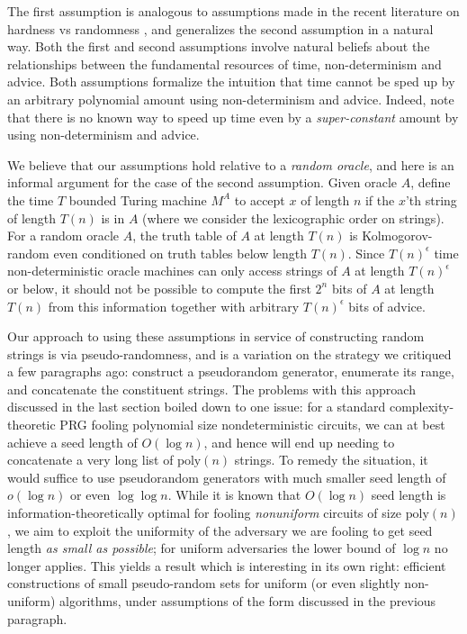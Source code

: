 \documentclass[11pt]{article}
\renewcommand{\poly}{\mathrm{poly}}
\begin{document}
The first assumption is analogous to assumptions made in the recent literature on hardness vs randomness \cite{CT21a}, and generalizes the second assumption in a natural way. Both the first and second assumptions involve natural beliefs about the relationships between the fundamental resources of time, non-determinism and advice. Both assumptions formalize the intuition that time cannot be sped up by an arbitrary polynomial amount using non-determinism and advice. Indeed, note that there is no known way to speed up time even by a {\it super-constant} amount by using non-determinism and advice. 

We believe that our assumptions hold relative to a {\it random oracle}, and here is an informal argument for the case of the second assumption. Given oracle $A$, define the time $T$ bounded Turing machine $M^A$ to accept $x$ of length $n$ if the $x$'th string of length $T(n)$ is in $A$ (where we consider the lexicographic order on strings). For a random oracle $A$, the truth table of $A$ at length $T(n)$ is Kolmogorov-random even conditioned on truth tables below length $T(n)$. Since $T(n)^{\epsilon}$ time non-deterministic oracle machines can only access strings of $A$ at length $T(n)^{\epsilon}$ or below, it should not be possible to compute the first $2^n$ bits of $A$ at length $T(n)$ from this information together with arbitrary $T(n)^{\epsilon}$ bits of advice.

Our approach to using these assumptions in service of constructing random strings is via pseudo-randomness, and is a variation on the strategy we critiqued a few paragraphs ago: construct a pseudorandom generator, enumerate its range, and concatenate the constituent strings. The problems with this approach discussed in the last section boiled down to one issue: for a standard complexity-theoretic PRG fooling polynomial size nondeterministic circuits, we can at best achieve a seed length of $O(\log n)$, and hence will end up needing to concatenate a very long list of $\poly(n)$ strings. To remedy the situation, it would suffice to use pseudorandom generators with much smaller seed length of $o(\log n)$ or even $\log \log n$. While it is known that $O(\log n)$ seed length is information-theoretically optimal for fooling \emph{nonuniform} circuits of size $\poly(n)$, we aim to exploit the uniformity of the adversary we are fooling to get seed length {\it as small as possible}; for uniform adversaries the lower bound of $\log n$ no longer applies. This yields a result which is interesting in its own right: efficient constructions of small pseudo-random sets for uniform (or even slightly non-uniform) algorithms, under assumptions of the form discussed in the previous paragraph. 
\end{document}
